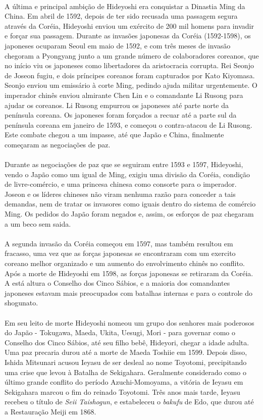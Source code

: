 \documentclass[12pt, a4paper]{article}
\begin{document}
            \\
            \indent A última e principal ambição de Hideyoshi era conquistar a Dinastia Ming da China. Em abril de 1592, depois de ter sido recusada uma passagem segura através da Coréia, Hideyoshi enviou um exército de 200 mil homens para invadir e forçar sua passagem. Durante as invasões japonesas da Coréia (1592-1598), os japoneses ocuparam Seoul em maio de 1592, e com três meses de invasão chegoram a Pyongyang junto a um grande número de colaboradores coreanos, que no início viu os japoneses como libertadores da aristocracia corrupta. Rei Seonjo de Joseon fugiu, e dois príncipes coreanos foram capturados por Kato Kiyomasa. Seonjo enviou um emissário à corte Ming, pedindo ajuda militar urgentemente. O imperador chinês enviou almirante Chen Lin e o comandante Li Rusong para ajudar os coreanos. Li Rusong empurrou os japoneses até parte norte da península coreana. Os japoneses foram forçados a recuar até a parte sul da península coreana em janeiro de 1593, e começou o contra-atacou de Li Rusong. Este combate chegou a um impasse, até que Japão e China, finalmente começaram as negociações de paz.\\
			\\
			\indent Durante as negociações de paz que se seguiram entre 1593 e 1597, Hideyoshi, vendo o Japão como um igual de Ming, exigiu uma divisão da Coréia, condição de livre-comércio, e uma princesa chinesa como consorte para o imperador. Joseon e os líderes chineses não viram nenhuma razão para conceder a tais demandas, nem de tratar os invasores como iguais dentro do sistema de comércio Ming. Os pedidos do Japão foram negados e, assim, os esforços de paz chegaram a um beco sem saida.\\
			\\
			\indent A segunda invasão da Coréia começou em 1597, mas também resultou em fracasso, uma vez que as  forças japonesas se encontraram com um exercito coreano melhor organizado e um aumento do envolvimento chinês no conflito. Após a morte de Hideyoshi em 1598, as forças japonesas se retiraram da Coréia. A está altura o Conselho dos Cinco Sábios, e a maioria dos comandantes japoneses estavam mais preocupados com batalhas internas e para o controle do shogunato.\\
			\\
			\indent Em seu leito de morte Hideyoshi nomeou um grupo dos senhores mais poderosos do Japão - Tokugawa, Maeda, Ukita, Uesugi, Mori - para governar como o Conselho dos Cinco Sábios, até seu filho bebê, Hideyori, chegar a idade adulta. Uma paz precaria durou até a morte de Maeda Toshiie em 1599. Depois disso, Ishida Mitsunari acusou Ieyasu de ser desleal ao nome Toyotomi, precipitando uma crise que levou à Batalha de Sekigahara. Geralmente considerado como o último grande conflito do período Azuchi-Momoyama, a vitória de Ieyasu em Sekigahara marcou o fim do reinado Toyotomi. Três anos mais tarde, Ieyasu recebeu o título de \textit{Seii Taishogun}, e estabeleceu o \textit{bakufu} de Edo, que durou até a Restauração Meiji em 1868.\\
			
\end{document}
